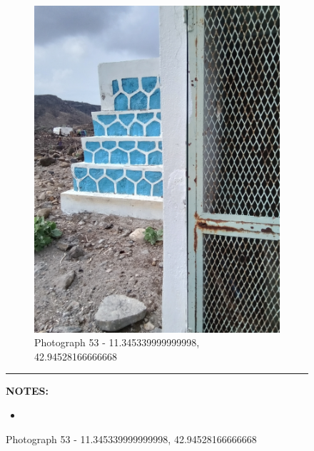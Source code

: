 \documentclass[12pt, letterpaper]{article}
\begin{document}
\begin{figure}[h]
{{                \begin{subfigure}{\linewidth}
                    \centering
                    \includegraphics[width=0.37\textheight, angle=-90]{photos/12.png}
                    \captionsetup{width=0.8\linewidth}
                    \caption{Photograph 53 - 11.345339999999998, 42.94528166666668}
                \end{subfigure}
                    \vspace{1mm}
                    \hrule
                \begin{minipage}[c][4.5cm][t]{1\textwidth} 
                    \begin{minipage}[t][2cm][t]{0.5\textwidth} 
	 				\vspace{2mm}
					\centering
					\textbf{\small{NOTES:}} \\ 
					\raggedright 
					\begin{itemize}
            					\item \footnotesize{}

\end{itemize}
\end{minipage}
\end{minipage}}}
\end{figure}
\end{document}
